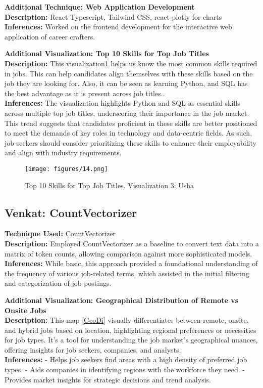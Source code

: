 \documentclass[a4paper,10pt]{article}
\begin{document}
\textbf{Additional Technique: Web Application Development}\\
\textbf{Description:} React Typescript, Tailwind CSS, react-plotly for charts \\
\textbf{Inferences:} Worked on the frontend development for the interactive web application of career crafters.


 \textbf{Additional Visualization: Top 10 Skills for Top Job Titles}\\
 \textbf{Description:} This visualization\ref{fig_usha} helps us know the most common skills required in jobs. This can help candidates align themselves with these skills based on the job they are looking for. Also, it can be seen as learning Python, and SQL has the best advantage as it is present across job titles..\\
\textbf{Inferences:} The visualization highlights Python and SQL as essential skills across multiple top job titles, underscoring their importance in the job market. This trend suggests that candidates proficient in these skills are better positioned to meet the demands of key roles in technology and data-centric fields. As such, job seekers should consider prioritizing these skills to enhance their employability and align with industry requirements.

\begin{figure}[ht]
    \centering
    \texttt{[image: figures/14.png]}
    \caption{Top 10 Skills for Top Job Titles. Visualization 3: Usha}
    \label{fig_usha}
    \end{figure}  
    
\subsection{Venkat: CountVectorizer}
\textbf{Technique Used:} CountVectorizer\\
\textbf{Description:} Employed CountVectorizer as a baseline to convert text data into a matrix of token counts, allowing comparison against more sophisticated models.\\
\textbf{Inferences:} While basic, this approach provided a foundational understanding of the frequency of various job-related terms, which assisted in the initial filtering and categorization of job postings.

\textbf{Additional Visualization: Geographical Distribution of Remote vs Onsite Jobs}\\
\textbf{Description:} This map \ref{GeoDi} visually differentiates between remote, onsite, and hybrid jobs based on location, highlighting regional preferences or necessities for job types. It's a tool for understanding the job market's geographical nuances, offering insights for job seekers, companies, and analysts.\\
\textbf{Inferences:}
- Helps job seekers find areas with a high density of preferred job types.
- Aids companies in identifying regions with the workforce they need.
- Provides market insights for strategic decisions and trend analysis.
\end{document}
